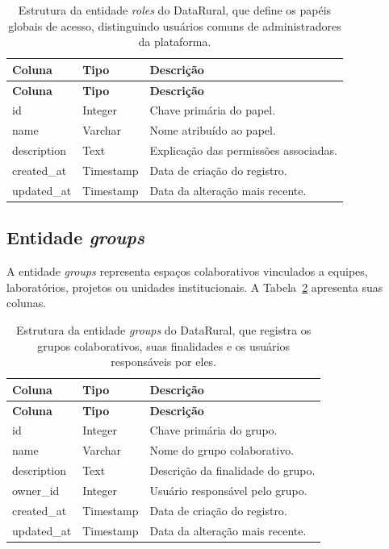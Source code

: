 \begin{longtable}{p{}p{}p{}}
\caption{Estrutura da entidade \textit{roles} do DataRural, que define os papéis globais de acesso, distinguindo usuários comuns de administradores da plataforma.}\label{tab:entity_roles}\\
\toprule
\textbf{Coluna} & \textbf{Tipo} & \textbf{Descrição} \\
\midrule
\endfirsthead
\toprule
\textbf{Coluna} & \textbf{Tipo} & \textbf{Descrição} \\
\midrule
\endhead
id & Integer & Chave primária do papel. \\
name & Varchar & Nome atribuído ao papel. \\
description & Text & Explicação das permissões associadas. \\
created\_at & Timestamp & Data de criação do registro. \\
updated\_at & Timestamp & Data da alteração mais recente. \\
\bottomrule
\end{longtable}

\subsection{Entidade \textit{groups}}

A entidade \textit{groups} representa espaços colaborativos vinculados a equipes, laboratórios, projetos ou unidades institucionais. A Tabela~\ref{tab:entity_groups} apresenta suas colunas.

\begin{longtable}{p{}p{}p{}}
\caption{Estrutura da entidade \textit{groups} do DataRural, que registra os grupos colaborativos, suas finalidades e os usuários responsáveis por eles.}\label{tab:entity_groups}\\
\toprule
\textbf{Coluna} & \textbf{Tipo} & \textbf{Descrição} \\
\midrule
\endfirsthead
\toprule
\textbf{Coluna} & \textbf{Tipo} & \textbf{Descrição} \\
\midrule
\endhead
id & Integer & Chave primária do grupo. \\
name & Varchar & Nome do grupo colaborativo. \\
description & Text & Descrição da finalidade do grupo. \\
owner\_id & Integer & Usuário responsável pelo grupo. \\
created\_at & Timestamp & Data de criação do registro. \\
updated\_at & Timestamp & Data da alteração mais recente. \\
\bottomrule
\end{longtable}

